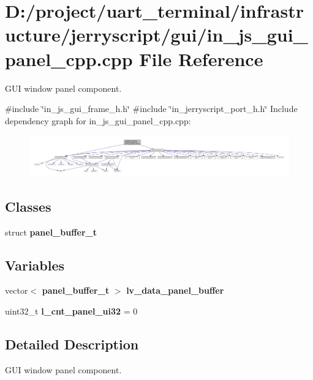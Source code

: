 \section{D\+:/project/uart\+\_\+terminal/infrastructure/jerryscript/gui/in\+\_\+js\+\_\+gui\+\_\+panel\+\_\+cpp.cpp File Reference}
\label{in__js__gui__panel__cpp_8cpp}


G\+UI window panel component.  


{\ttfamily \#include \char`\"{}in\+\_\+js\+\_\+gui\+\_\+frame\+\_\+h.\+h\char`\"{}}\newline
{\ttfamily \#include \char`\"{}in\+\_\+jerryscript\+\_\+port\+\_\+h.\+h\char`\"{}}\newline
Include dependency graph for in\+\_\+js\+\_\+gui\+\_\+panel\+\_\+cpp.\+cpp\+:
\nopagebreak
\begin{figure}[H]
\begin{center}
\leavevmode
\includegraphics[width=350pt]{in__js__gui__panel__cpp_8cpp__incl}
\end{center}
\end{figure}
\subsection*{Classes}
\begin{DoxyCompactItemize}
\item 
struct \textbf{ panel\+\_\+buffer\+\_\+t}
\end{DoxyCompactItemize}
\subsection*{Variables}
\begin{DoxyCompactItemize}
\item 
vector$<$ \textbf{ panel\+\_\+buffer\+\_\+t} $>$ \textbf{ lv\+\_\+data\+\_\+panel\+\_\+buffer}
\item 
uint32\+\_\+t {\bfseries l\+\_\+cnt\+\_\+panel\+\_\+ui32} = 0
\end{DoxyCompactItemize}


\subsection{Detailed Description}
G\+UI window panel component. 

